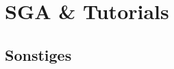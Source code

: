 \documentclass[pdftex,fontsize=12pt,a4paper,numbers=noenddot]{scrreprt}
\begin{document}


\newpage
{} %

\tableofcontents %

\newpage
{} %
\pagestyle{scrheadings}
\renewcommand{\chapterpagestyle}{scrheadings}


\part{}






\part{SGA \& Tutorials}
%
%

\chapter{Sonstiges}
%




\cleardoublepage
\appendix
\end{document}
